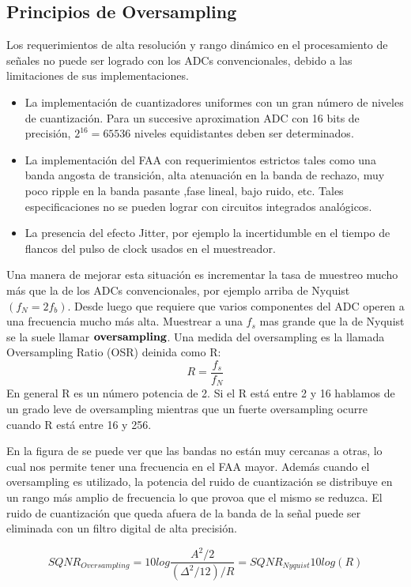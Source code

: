 \documentclass[assd_tp3_main.tex]{subfiles}
\begin{document}
\subsection{Principios de Oversampling}
Los requerimientos de alta resolución y rango dinámico en el procesamiento de señales no puede ser logrado con los ADCs convencionales, debido a las limitaciones de sus implementaciones.
\begin{itemize}
\item La implementación de cuantizadores uniformes con un gran número de niveles de cuantización. Para un succesive aproximation ADC con 16 bits de precisión, $2^16=65536$ niveles equidistantes deben ser determinados.
\item La implementación del FAA con requerimientos estrictos tales como una banda angosta de transición, alta atenuación en la banda de rechazo, muy poco ripple en la banda pasante ,fase lineal, bajo ruido, etc. Tales especificaciones no se pueden lograr con circuitos integrados analógicos.
\item La presencia del efecto Jitter, por ejemplo la incertidumble en el tiempo de flancos del pulso de clock usados en el muestreador. 
\end{itemize}
Una manera de mejorar esta situación es incrementar la tasa de muestreo mucho más que la de los ADCs convencionales, por ejemplo arriba de Nyquist $(f_{N}=2f_b)$. Desde luego que requiere que varios componentes del ADC operen a una frecuencia mucho más alta. Muestrear a una $f_s$ mas grande que la de Nyquist se la suele llamar $\bold{oversampling}$.
Una medida del oversampling es la llamada Oversampling Ratio (OSR) deinida como R:
\[ R=\frac{f_s}{f_N} \]
En general R es un número potencia de 2. Si el R está entre 2 y 16 hablamos de un grado leve de oversampling mientras que un fuerte oversampling ocurre cuando R está entre 16 y 256.


En la figura de
se puede ver que las bandas no están muy cercanas a otras, lo cual nos permite tener una frecuencia en el FAA mayor.
Además cuando el oversampling es utilizado, la potencia del ruido de cuantización se distribuye en un rango más amplio de frecuencia lo que provoa que el mismo se reduzca.
El ruido de cuantización que queda afuera de la banda de la señal puede ser eliminada con un filtro digital de alta precisión. 

\[ SQNR_{Oversampling}=10log\frac{A^2/2}{(\Delta^2/12)/R}=SQNR_{Nyquist}10log(R) \]

\end{document}
